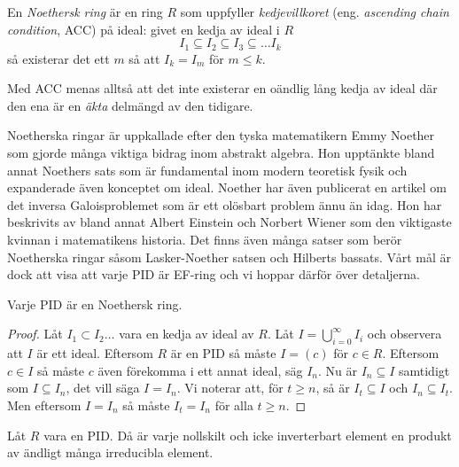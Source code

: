 \documentclass{article}
\theoremstyle{definition}
\begin{document}
\begin{mydef}{}{}
  En \textit{Noethersk ring} är en ring $R$ som uppfyller \textit{kedjevillkoret} (eng. \textit{ascending chain condition}, ACC)
  på ideal: givet en kedja av ideal i $R$
  \[ I_1 \subseteq I_2 \subseteq I_3 \subseteq \ldots I_k\]
  så existerar det ett $m$ så att $I_k = I_m$ för $m \leq k$.
\end{mydef}
Med ACC menas alltså att det inte existerar en oändlig lång kedja av ideal där den ena är en \textit{äkta} delmängd av den tidigare. 

Noetherska ringar 
är uppkallade efter den tyska matematikern Emmy Noether som gjorde många viktiga bidrag inom abstrakt algebra. Hon upptänkte bland annat 
Noethers sats som är fundamental inom modern teoretisk fysik och expanderade även konceptet om ideal. 
Noether har även publicerat en artikel om det inversa Galoisproblemet som är ett olösbart problem ännu än idag. Hon har beskrivits av bland annat 
Albert Einstein och Norbert Wiener som den viktigaste kvinnan i matematikens historia. Det finns även många satser som berör Noetherska ringar
såsom Lasker-Noether satsen och Hilberts bassats. Vårt mål är dock att visa att varje PID är EF-ring och vi hoppar därför över detaljerna. 

\hypertarget{pidnoe}{}
\begin{mytheo}{}{}
  Varje PID är en Noethersk ring. 
\end{mytheo}

\begin{proof}
  Låt $I_1 \subset I_2 \ldots$ vara en kedja av ideal av $R$. Låt $I = \bigcup_{i = 0}^{\infty} I_i$ och observera att $I$ är ett ideal. Eftersom 
  $R$ är en PID så måste $I = (c)$ för $c \in R$. Eftersom $c \in I$ så måste $c$ även förekomma i ett annat ideal, säg $I_n$. 
  Nu är $I_n \subseteq I$ samtidigt som $I \subseteq I_n$, det vill säga $I = I_n$. Vi noterar att, för $t \geq n$, så är 
  $I_t \subseteq I$ och $I_n \subseteq I_t$. Men eftersom $I = I_n$ så måste $I_t = I_n$ för alla $t \geq n$.
\end{proof}

\hypertarget{inv}{}
\begin{mytheo}{}{}
  Låt $R$ vara en PID. Då är varje nollskilt och icke inverterbart element en produkt av ändligt många irreducibla element.
\end{mytheo}
\end{document}
